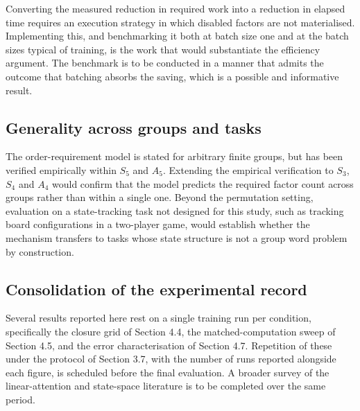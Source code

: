 Converting the measured reduction in required work into a reduction in elapsed
time requires an execution strategy in which disabled factors are not
materialised. Implementing this, and benchmarking it both at batch size one and
at the batch sizes typical of training, is the work that would substantiate the
efficiency argument. The benchmark is to be conducted in a manner that admits the
outcome that batching absorbs the saving, which is a possible and informative
result.

\subsection{Generality across groups and tasks}

The order-requirement model is stated for arbitrary finite groups, but has been
verified empirically within $S_5$ and $A_5$. Extending the empirical
verification to $S_3$, $S_4$ and $A_4$ would confirm that the model predicts the
required factor count across groups rather than within a single one. Beyond the
permutation setting, evaluation on a state-tracking task not designed for this
study, such as tracking board configurations in a two-player game, would
establish whether the mechanism transfers to tasks whose state structure is not
a group word problem by construction.

\subsection{Consolidation of the experimental record}

Several results reported here rest on a single training run per condition,
specifically the closure grid of Section 4.4, the matched-computation sweep of
Section 4.5, and the error characterisation of Section 4.7. Repetition of these
under the protocol of Section 3.7, with the number of runs reported alongside
each figure, is scheduled before the final evaluation. A broader survey of the
linear-attention and state-space literature is to be completed over the same
period.
\null
